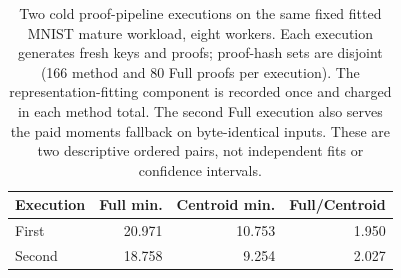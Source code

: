 \begin{table}[t]
\centering
\caption{Two cold proof-pipeline executions on the same fixed fitted MNIST mature workload, eight workers. Each execution generates fresh keys and proofs; proof-hash sets are disjoint (166 method and 80 Full proofs per execution). The representation-fitting component is recorded once and charged in each method total. The second Full execution also serves the paid moments fallback on byte-identical inputs. These are two descriptive ordered pairs, not independent fits or confidence intervals.}
\label{tab:timing-repeat}
\begin{tabular}{lrrr}
\toprule
Execution & Full min. & Centroid min. & Full/Centroid\\
\midrule
First & 20.971 & 10.753 & 1.950\\
Second & 18.758 & 9.254 & 2.027\\
\bottomrule
\end{tabular}
\end{table}
